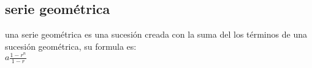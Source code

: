 \subsection{serie geométrica}
una serie geométrica es una sucesión creada con la suma del los términos de una sucesión geométrica, su formula es:
\\$a\frac{1-r^{n}}{1-r}$